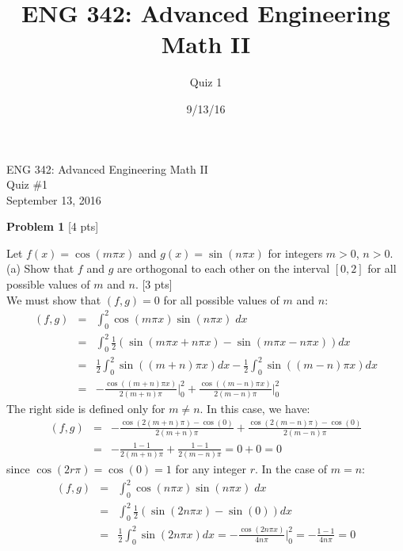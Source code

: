\documentclass[11pt]{article}
\begin{document}
\title{ENG 342: Advanced Engineering Math II}
\author{Quiz 1}
\date{9/13/16}

{\Large ENG 342: Advanced Engineering Math II} \\

{\large Quiz \#1} \\

September 13, 2016 \\

\newpage

\textbf{Problem 1} [4 pts]

\vspace{0.1in}

Let $f(x) = \cos (m \pi x)$ and $g(x) = \sin (n \pi x)$ for integers $m > 0$, $n > 0$. \\

(a) Show that $f$ and $g$ are orthogonal to each other on the interval $[0, 2]$ for all possible values of $m$ and $n$. [3 pts] \\

We must show that $(f, g) = 0$ for all possible values of $m$ and $n$:
\begin{eqnarray*}
(f, g) &=& \int_0^2 \cos (m \pi x) \sin (n \pi x) \; dx \\
	&=& \int_0^2 \frac{1}{2} \left( \sin(m \pi x + n \pi x) - \sin(m \pi x - n \pi x) \right) dx \\
	&=& \frac{1}{2} \int_0^2 \sin((m + n) \pi x) dx - \frac{1}{2} \int_0^2 \sin((m - n)\pi x) dx \\
	&=& -\frac{\cos( (m+n) \pi x)}{2 (m+n) \pi} \biggr\rvert_0^2 + \frac{\cos( (m-n) \pi x)}{2 (m-n) \pi} \biggr \rvert_0^2
\end{eqnarray*}
The right side is defined only for $m \neq n$. In this case, we have:
\begin{eqnarray*}
(f, g) &=& -\frac{\cos( 2 (m+n) \pi) - \cos(0)}{2 (m+n) \pi} + \frac{\cos( 2 (m-n) \pi) - \cos(0)}{2 (m-n) \pi} \\
	&=& -\frac{1 - 1}{2 (m+n) \pi} + \frac{1 - 1}{2 (m-n) \pi} = 0 + 0 = 0
\end{eqnarray*}
since $\cos(2 r \pi ) = \cos(0) = 1$ for any integer $r$. In the case of $m = n$:
\begin{eqnarray*}
(f, g) &=& \int_0^2 \cos (n \pi x) \sin (n \pi x) \; dx \\
	&=& \int_0^2 \frac{1}{2} \left( \sin(2 n \pi x) - \sin(0) \right) dx \\
	&=& \frac{1}{2} \int_0^2 \sin(2 n \pi x) dx = -\frac{\cos( 2 n \pi x)}{4 n \pi} \biggr\rvert_0^2 = -\frac{1 - 1}{4 n \pi} = 0 \\
\end{eqnarray*}
\end{document}

